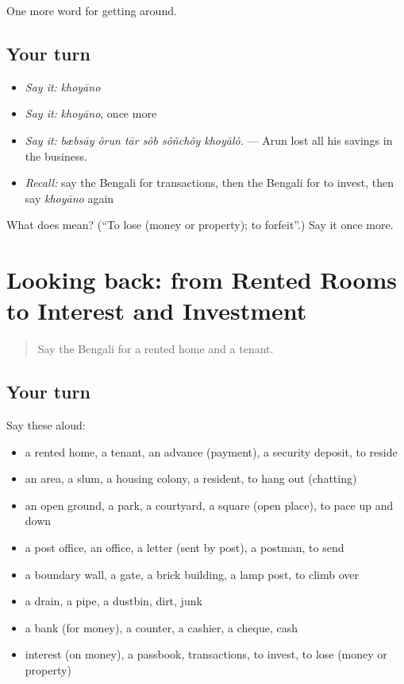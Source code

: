 \begin{grammarlens}[title={What you've built}]
One more word for getting around.
\end{grammarlens}

\subsection*{Your turn}
\begin{itemize}
\raggedright
  \item \emph{Say it:} \emph{khoyāno}
  \item \emph{Say it:} \emph{khoyāno}, once more
  \item \emph{Say it:} \emph{bæbsāy ôrun tār sôb sôñchôy khoyālô.} — Arun lost all his savings in the business.
  \item \emph{Recall:} say the Bengali for transactions, then the Bengali for to invest, then say \emph{khoyāno} again
\end{itemize}

\begin{tcolorbox}[breakable,colback=teal!4,colframe=teal!35!black,title={Before you move on}]
What does  mean? (\textquotedblleft{}To lose (money or property); to forfeit\textquotedblright{}.) Say it once more.
\end{tcolorbox}
\section[(dialogue)]{Looking back: from Rented Rooms to Interest and Investment}

\label{lesson:BN-R415-review-408-415}



\begin{quote}
Say the Bengali for a rented home and a tenant.
\end{quote}

\subsection*{Your turn}
Say these aloud:

\begin{itemize}
\raggedright
  \item a rented home, a tenant, an advance (payment), a security deposit, to reside
  \item an area, a slum, a housing colony, a resident, to hang out (chatting)
  \item an open ground, a park, a courtyard, a square (open place), to pace up and down
  \item a post office, an office, a letter (sent by post), a postman, to send
  \item a boundary wall, a gate, a brick building, a lamp post, to climb over
  \item a drain, a pipe, a dustbin, dirt, junk
  \item a bank (for money), a counter, a cashier, a cheque, cash
  \item interest (on money), a passbook, transactions, to invest, to lose (money or property)
\end{itemize}

